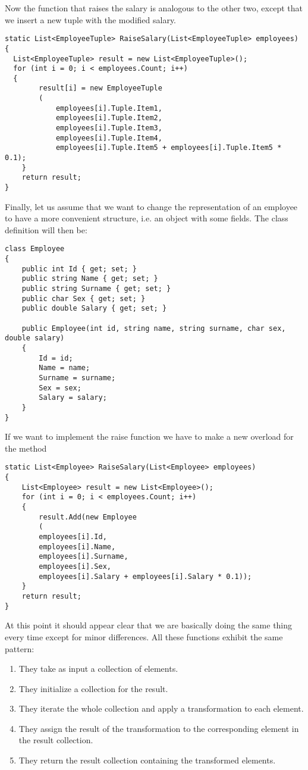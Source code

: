 Now the function that raises the salary is analogous to the other two, except that we insert a new tuple with the modified salary.

\begin{lstlisting}
static List<EmployeeTuple> RaiseSalary(List<EmployeeTuple> employees)
{
  List<EmployeeTuple> result = new List<EmployeeTuple>();
  for (int i = 0; i < employees.Count; i++)
  {
		result[i] = new EmployeeTuple
		(
			employees[i].Tuple.Item1,
			employees[i].Tuple.Item2,
			employees[i].Tuple.Item3,
			employees[i].Tuple.Item4,
			employees[i].Tuple.Item5 + employees[i].Tuple.Item5 * 0.1);
	}
	return result;
}
\end{lstlisting}

Finally, let us assume that we want to change the representation of an employee to have a more convenient structure, i.e. an object with some fields. The class definition will then be:

\begin{lstlisting}
class Employee
{
	public int Id { get; set; }
	public string Name { get; set; }
	public string Surname { get; set; }
	public char Sex { get; set; }
	public double Salary { get; set; }

	public Employee(int id, string name, string surname, char sex, double salary)
	{
		Id = id;
		Name = name;
		Surname = surname;
		Sex = sex;
		Salary = salary;
	}
}
\end{lstlisting}

If we want to implement the raise function we have to make a new overload for the method

\begin{lstlisting}
static List<Employee> RaiseSalary(List<Employee> employees)
{
	List<Employee> result = new List<Employee>();
	for (int i = 0; i < employees.Count; i++)
	{
		result.Add(new Employee
		(
		employees[i].Id,
		employees[i].Name,
		employees[i].Surname,
		employees[i].Sex,
		employees[i].Salary + employees[i].Salary * 0.1));
	}
	return result;
}
\end{lstlisting}

At this point it should appear clear that we are basically doing the same thing every time except for minor differences. All these functions exhibit the same pattern:

\begin{enumerate}[noitemsep]
	\item They take as input a collection of elements.
	\item They initialize a collection for the result.
	\item They iterate the whole collection and apply a transformation to each element.
	\item They assign the result of the transformation to the corresponding element in the result collection.
	\item They return the result collection containing the transformed elements.
\end{enumerate}

